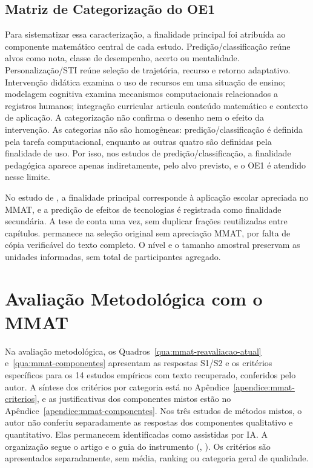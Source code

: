 \subsection{Matriz de Categorização do OE1}
\label{sec:matriz-oe1}

Para sistematizar essa caracterização, a finalidade principal foi atribuída ao componente matemático central de cada estudo. Predição/classificação reúne alvos como nota, classe de desempenho, acerto ou mentalidade. Personalização/STI reúne seleção de trajetória, recurso e retorno adaptativo. Intervenção didática examina o uso de recursos em uma situação de ensino; modelagem cognitiva examina mecanismos computacionais relacionados a registros humanos; integração curricular articula conteúdo matemático e contexto de aplicação. A categorização não confirma o desenho nem o efeito da intervenção. As categorias não são homogêneas: predição/classificação é definida pela tarefa computacional, enquanto as outras quatro são definidas pela finalidade de uso. Por isso, nos estudos de predição/classificação, a finalidade pedagógica aparece apenas indiretamente, pelo alvo previsto, e o OE1 é atendido nesse limite.

No estudo de , a finalidade principal corresponde à aplicação escolar apreciada no MMAT, e a predição de efeitos de tecnologias é registrada como finalidade secundária. A tese de  conta uma vez, sem duplicar frações reutilizadas entre capítulos.  permanece na seleção original sem apreciação MMAT, por falta de cópia verificável do texto completo. O nível e o tamanho amostral preservam as unidades informadas, sem total de participantes agregado.



\section{Avaliação Metodológica com o MMAT}
\label{sec:qualidade-estudos}

Na avaliação metodológica, os Quadros~\ref{qua:mmat-reavaliacao-atual} e~\ref{qua:mmat-componentes} apresentam as respostas S1/S2 e os critérios específicos para os 14 estudos empíricos com texto recuperado, conferidos pelo autor. A síntese dos critérios por categoria está no Apêndice~\ref{apendice:mmat-criterios}, e as justificativas dos componentes mistos estão no Apêndice~\ref{apendice:mmat-componentes}. Nos três estudos de métodos mistos, o autor não conferiu separadamente as respostas dos componentes qualitativo e quantitativo. Elas permanecem identificadas como assistidas por IA. A organização segue o artigo e o guia do instrumento (\citeauthor{MMAT2018}, \citeyear{MMAT2018,MMATGuide2018}). Os critérios são apresentados separadamente, sem média, ranking ou categoria geral de qualidade.

